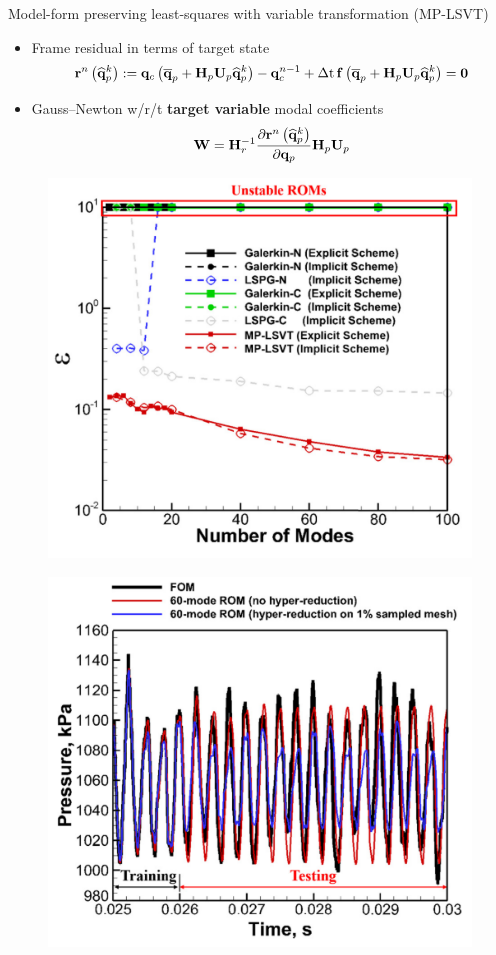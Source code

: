 \documentclass[]{beamer}
\begin{document}
\begin{frame}{\small{Model-form preserving least-squares with variable transformation (MP-LSVT)\footnotemark[7]}}
	\begin{itemize}
		\item Frame residual in terms of target state
		\begin{equation*}
			\resFuncIter{\timeIdx}{\primVecCoef^{\newtonIdx}} \defEq \consFunc{\primVecCent + \primScale \primTrial \primVecCoef^{\newtonIdx}} - \consVec^{\timeIdx-1} + \dt \, \rhsFunc{\primVecCent + \primScale \primTrial \primVecCoef^{\newtonIdx}} = \zeroVec
		\end{equation*}
		\item Gauss--Newton w/r/t \textbf{target variable} modal coefficients
		\begin{equation*}
			\testBasis = \resScaleInv \pde{\resFuncIter{\timeIdx}{\primVecCoef^{\newtonIdx}}}{\primVec} \primScale \primTrial
		\end{equation*}
	\end{itemize}
	\begin{minipage}{0.49\linewidth}
		\centering
		\begin{figure}
			\includegraphics[width=0.75\linewidth]{theory/mplsvt_err_vs_modes.png}
		\end{figure}
	\end{minipage}
	\begin{minipage}{0.49\linewidth}
		\centering
		\begin{figure}
			\includegraphics[width=0.75\linewidth]{theory/mplsvt_pressure_probe.png}

\end{figure}
\end{minipage}
\end{frame}
\end{document}
